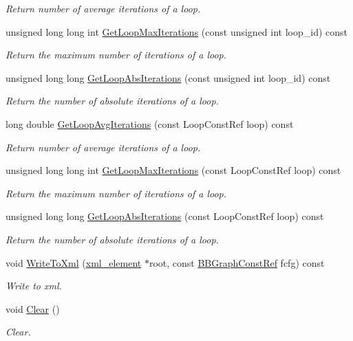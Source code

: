 \begin{DoxyCompactItemize}
\begin{DoxyCompactList}\small\item\em Return number of average iterations of a loop. \end{DoxyCompactList}\item 
unsigned long long int \hyperlink{classProfilingInformation_a840efae2165a4271c99184e088bc38e4}{Get\+Loop\+Max\+Iterations} (const unsigned int loop\+\_\+id) const
\begin{DoxyCompactList}\small\item\em Return the maximum number of iterations of a loop. \end{DoxyCompactList}\item 
unsigned long long \hyperlink{classProfilingInformation_a64aabe42419cc5a5f0d92530638ae09a}{Get\+Loop\+Abs\+Iterations} (const unsigned int loop\+\_\+id) const
\begin{DoxyCompactList}\small\item\em Return the number of absolute iterations of a loop. \end{DoxyCompactList}\item 
long double \hyperlink{classProfilingInformation_a29fb3019434a6b893e554dfd8438076f}{Get\+Loop\+Avg\+Iterations} (const Loop\+Const\+Ref loop) const
\begin{DoxyCompactList}\small\item\em Return number of average iterations of a loop. \end{DoxyCompactList}\item 
unsigned long long int \hyperlink{classProfilingInformation_a32103f572280605cf93ff372a1d1421f}{Get\+Loop\+Max\+Iterations} (const Loop\+Const\+Ref loop) const
\begin{DoxyCompactList}\small\item\em Return the maximum number of iterations of a loop. \end{DoxyCompactList}\item 
unsigned long long \hyperlink{classProfilingInformation_af6b4f658ff4e27fc346f68167dba069a}{Get\+Loop\+Abs\+Iterations} (const Loop\+Const\+Ref loop) const
\begin{DoxyCompactList}\small\item\em Return the number of absolute iterations of a loop. \end{DoxyCompactList}\item 
void \hyperlink{classProfilingInformation_a375a5ce9e10012e523afa9514fb95e89}{Write\+To\+Xml} (\hyperlink{classxml__element}{xml\+\_\+element} $\ast$root, const \hyperlink{basic__block_8hpp_ab66bdbde3a29e41d079d8a320af9c921}{B\+B\+Graph\+Const\+Ref} fcfg) const
\begin{DoxyCompactList}\small\item\em Write to xml. \end{DoxyCompactList}\item 
void \hyperlink{classProfilingInformation_ad3818cd6989e87b00623689163f55c85}{Clear} ()
\begin{DoxyCompactList}\small\item\em Clear. \end{DoxyCompactList}\end{DoxyCompactItemize}

